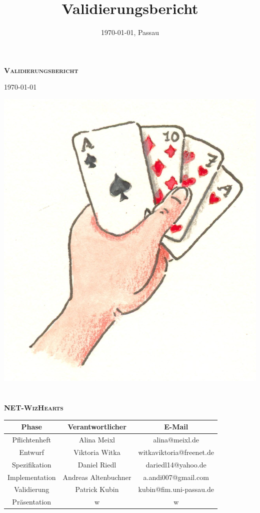 \documentclass[titlepage,10pt,a4paper]{article}
\title{Validierungsbericht}
\date{\today{}, Passau}
\begin{document}
\begin{titlepage}
\vspace*{3cm}
\begin{center}
\textbf{\textsc{\LARGE Validierungsbericht}}

{\large \today}

\vspace{2cm}
\includegraphics{kartenspiel}
\ \\
\ \\

\textbf{\textsc{\LARGE NET-WizHearts}}
\vspace{2cm}

\begin{tabular}{|c|c|c|}\hline
   Phase & Verantwortlicher & E-Mail \\ \hline\hline
   Pflichtenheft & Alina Meixl &  alina@meixl.de \\ \hline
   Entwurf & Viktoria Witka & witkaviktoria@freenet.de \\ \hline
   Spezifikation & Daniel Riedl & dariedl14@yahoo.de \\ \hline
   Implementation & Andreas Altenbuchner& a.andi007@gmail.com\\ \hline
   Validierung & Patrick Kubin & kubin@fim.uni-passau.de\\ \hline
   Präsentation & w& w\\ \hline
 \end{tabular}
\vspace{2cm}
\\
\end{center}
\end{titlepage}
\tableofcontents
{}
\hypersetup{pageanchor=true}
\end{document}

